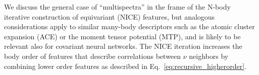 We discuss the general case of ``multispectra'' in the frame of the N-body iterative construction of equivariant (NICE) features\cite{niga+20jcp}, but analogous considerations apply to similar many-body descriptors such as the atomic cluster expansion (ACE)\cite{drau19prb,dusson2022atomic} or the moment tensor potential (MTP)\cite{shapeev2016moment}, and is likely to be relevant also for covariant neural networks\cite{ande+19nips,mill2020arxiv}. 
The NICE iteration increases the body order of features that describe correlations between $\nu$ neighbors 
by combining lower order features as described in Eq.~\eqref{eq:recursive_higherorder}.

